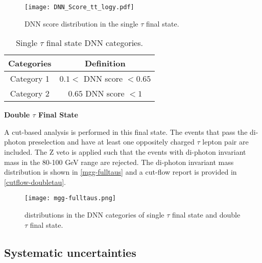 {\begin{figure}[h!]
    \centering
	\texttt{[image: DNN\_Score\_tt\_logy.pdf]}
	\vspace{2mm}
	\caption{DNN score distribution in the single $\tau$ final state.}
	\label{dnnscore-singletau}
\end{figure}

\begin{table}[h!]
    \centering
    \begin{tabular}{cc}
    \hline
    \hline
        Categories  &   Definition \\
        \hline
        Category 1 & $ 0.1< $ DNN score $ <0.65$ \\
        Category 2 & $ 0.65 $ DNN score $ <1 $\\
         \hline
    \end{tabular}
    \caption{Single $\tau$ final state DNN categories.}
    \label{onetau-cats}
\end{table}

\textbf{Double $\tau$ Final State}

A cut-based analysis is performed in this final state. The events that pass the di-photon preselection and have at least one oppositely charged $\tau$ lepton pair are included. The Z veto is applied such that the events with di-photon invariant mass in the 80-100 GeV range are rejected. The di-photon invariant mass distribution is shown in \autoref{mgg-fulltaus} and a cut-flow report is provided in \autoref{cutflow-doubletau}.

\begin{figure}[h!]
    \centering
	\texttt{[image: mgg-fulltaus.png]}
	\vspace{2mm}
	\caption{\mgg distributions in the DNN categories of single $\tau$ final state and double $\tau$ final state.}
	\label{mgg-fulltaus}
\end{figure}

\subsection{Systematic uncertainties}

}
